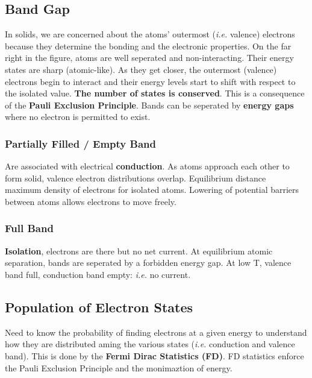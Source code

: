 \documentclass[a4paper, fontsize=8pt, landscape, DIV=1]{scrartcl}
\begin{document}
\begin{multicols*}{4}
  \subsection{Band Gap}
  \ifdefined\makeultracompact\else
    In solids, we are concerned about the atoms' outermost (\textit{i.e.} valence) electrons because they determine the bonding and the electronic properties.
    On the far right in the figure, atoms are well seperated and non-interacting. 
    Their energy states are sharp (atomic-like). 
    As they get closer, the outermost (valence) electrons begin to interact and their energy levels start to shift with respect to the isolated value. 
    \textbf{The number of states is conserved}. 
    This is a consequence of the \textbf{Pauli Exclusion Principle}. 
    Bands can be seperated by \textbf{energy gaps} where no electron is permitted to exist.
  
    \subsubsection{Partially Filled / Empty Band}
    Are associated with electrical \textbf{conduction}. 
    As atoms approach each other to form solid, valence electron distributions overlap. 
    Equilibrium distance ~ maximum density of electrons for isolated atoms.  
    Lowering of potential barriers between atoms allows electrons to move freely.

    \subsubsection{Full Band}
    \textbf{Isolation}, electrons are there but no net current. 
    At equilibrium atomic separation, bands are seperated by a forbidden energy gap. 
    At low T, valence band full, conduction band empty: \textit{i.e.} no current.
  \fi

  \subsection{Population of Electron States}
  \ifdefined\makeultracompact\else
    Need to know the probability of finding electrons at a given energy to understand how they are distributed aming the various states 
    (\textit{i.e.} conduction and valence band). 
    This is done by the \textbf{Fermi Dirac Statistics (FD)}. 
    FD statistics enforce the Pauli Exclusion Principle and the monimaztion of energy.
  \fi
  

\end{multicols*}
\end{document}
